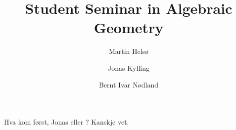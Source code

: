 \documentclass[a4paper, UKenglish]{report}
\title
{
    \bfseries\sffamily
    Student Seminar in Algebraic Geometry
}
\author
{
    Martin Hels\o
    \and
    Jonas Kylling
    \and 
    Bernt Ivar N\o dland
}
\begin{document}
\begin{titlepage}
    \maketitle
\end{titlepage}

\noindent Hva kom først, Jonas eller \kern-7pt \egg ? Kanskje \cite{Huy06} vet.

\clearpage
\printbibliography
\end{document}

